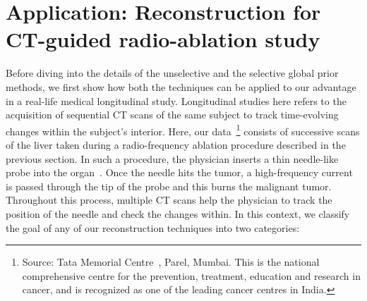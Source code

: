 \documentclass[journal]{IEEEtran}
\begin{document}
\section{Application: Reconstruction for CT-guided radio-ablation study}
\label{sec:tmh}
Before diving into the details of the unselective and the selective global prior methods, we first show how both the techniques can be applied to our advantage in a real-life medical longitudinal study. Longitudinal studies here refers to the acquisition of sequential CT scans of the same subject to track time-evolving changes within the subject's interior. Here, our data~\footnote{Source: Tata Memorial Centre~\cite{tmh}, Parel, Mumbai.  This is the national comprehensive centre for the prevention, treatment, education and research in cancer, and is recognized as one of the leading cancer centres in India.} consists of successive scans of the liver taken during a radio-frequency ablation procedure described in the previous section. In such a procedure, the physician inserts a thin needle-like probe into the organ~\cite{rfa}. Once the needle hits the tumor, a high-frequency current is passed through the tip of the probe and this burns the malignant tumor. Throughout this process, multiple CT scans help the physician to track the position of the needle and check the changes within. In this context, we classify the goal of any of our reconstruction techniques into two categories: 
\end{document}
